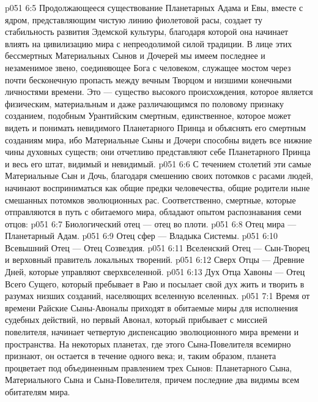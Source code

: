 \vs p051 6:5 \pc Продолжающееся существование Планетарных Адама и Евы, вместе с ядром, представляющим чистую линию фиолетовой расы, создает ту стабильность развития Эдемской культуры, благодаря которой она начинает влиять на цивилизацию мира с непреодолимой силой традиции. В лице этих бессмертных Материальных Сынов и Дочерей мы имеем последнее и незаменимое звено, соединяющее Бога с человеком, служащее мостом через почти бесконечную пропасть между вечным Творцом и низшими конечными личностями времени. Это --- существо высокого происхождения, которое является физическим, материальным и даже различающимся по половому признаку созданием, подобным Урантийским смертным, единственное, которое может видеть и понимать невидимого Планетарного Принца и объяснять его смертным созданиям мира, ибо Материальные Сыны и Дочери способны видеть все нижние чины духовных существ; они отчетливо представляют себе Планетарного Принца и весь его штат, видимый и невидимый.
\vs p051 6:6 С течением столетий эти самые Материальные Сын и Дочь, благодаря смешению своих потомков с расами людей, начинают восприниматься как общие предки человечества, общие родители ныне смешанных потомков эволюционных рас. Соответственно, смертные, которые отправляются в путь с обитаемого мира, обладают опытом распознавания семи отцов:
\vs p051 6:7 \pc {}\bibnobreakspace Биологический отец --- отец во плоти.
\vs p051 6:8 \bibnobreakspace Отец мира --- Планетарный Адам.
\vs p051 6:9 \bibnobreakspace Отец сфер --- Владыка Системы.
\vs p051 6:10 \bibnobreakspace Всевышний Отец --- Отец Созвездия.
\vs p051 6:11 \bibnobreakspace Вселенский Отец --- Сын\hyp{}Творец и верховный правитель локальных творений.
\vs p051 6:12 \bibnobreakspace Сверх Отцы --- Древние Дней, которые управляют сверхвселенной.
\vs p051 6:13 \bibnobreakspace Дух Отца Хавоны --- Отец Всего Сущего, который пребывает в Раю и посылает свой дух жить и творить в разумах низших созданий, населяющих вселенную вселенных.
\vs p051 7:1 Время от времени Райские Сыны\hyp{}Авоналы приходят в обитаемые миры для исполнения судебных действий, но первый Авонал, который прибывает с миссией повелителя, начинает четвертую диспенсацию эволюционного мира времени и пространства. На некоторых планетах, где этого Сына\hyp{}Повелителя всемирно признают, он остается в течение одного века; и, таким образом, планета процветает под объединенным правлением трех Сынов: Планетарного Сына, Материального Сына и Сына\hyp{}Повелителя, причем последние два видимы всем обитателям мира.
